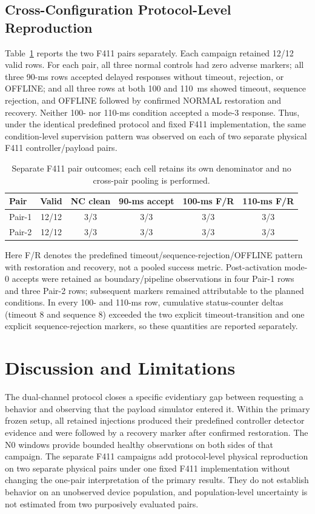 \documentclass[conference]{IEEEtran}
\begin{document}
\subsection{Cross-Configuration Protocol-Level Reproduction}

Table~\ref{tab:f411} reports the two F411 pairs separately. Each campaign retained 12/12 valid rows. For each pair, all three normal controls had zero adverse markers; all three 90-ms rows accepted delayed responses without timeout, rejection, or OFFLINE; and all three rows at both 100 and 110~ms showed timeout, sequence rejection, and OFFLINE followed by confirmed NORMAL restoration and recovery. Neither 100- nor 110-ms condition accepted a mode-3 response. Thus, under the identical predefined protocol and fixed F411 implementation, the same condition-level supervision pattern was observed on each of two separate physical F411 controller/payload pairs.

\begin{table}[t]
\caption{Separate F411 pair outcomes; each cell retains its own denominator and no cross-pair pooling is performed.}
\label{tab:f411}
\centering
\scriptsize
\begin{tabular}{lccccc}
\toprule
Pair & Valid & NC clean & 90-ms accept & 100-ms F/R & 110-ms F/R \\
\midrule
Pair-1 & 12/12 & 3/3 & 3/3 & 3/3 & 3/3 \\
Pair-2 & 12/12 & 3/3 & 3/3 & 3/3 & 3/3 \\
\bottomrule
\end{tabular}
\end{table}

Here F/R denotes the predefined timeout/sequence-rejection/OFFLINE pattern with restoration and recovery, not a pooled success metric. Post-activation mode-0 accepts were retained as boundary/pipeline observations in four Pair-1 rows and three Pair-2 rows; subsequent markers remained attributable to the planned conditions. In every 100- and 110-ms row, cumulative status-counter deltas (timeout 8 and sequence 8) exceeded the two explicit timeout-transition and one explicit sequence-rejection markers, so these quantities are reported separately.

\section{Discussion and Limitations}

The dual-channel protocol closes a specific evidentiary gap between requesting a behavior and observing that the payload simulator entered it. Within the primary frozen setup, all retained injections produced their predefined controller detector evidence and were followed by a recovery marker after confirmed restoration. The N0 windows provide bounded healthy observations on both sides of that campaign. The separate F411 campaigns add protocol-level physical reproduction on two separate physical pairs under one fixed F411 implementation without changing the one-pair interpretation of the primary results. They do not establish behavior on an unobserved device population, and population-level uncertainty is not estimated from two purposively evaluated pairs.
\end{document}
